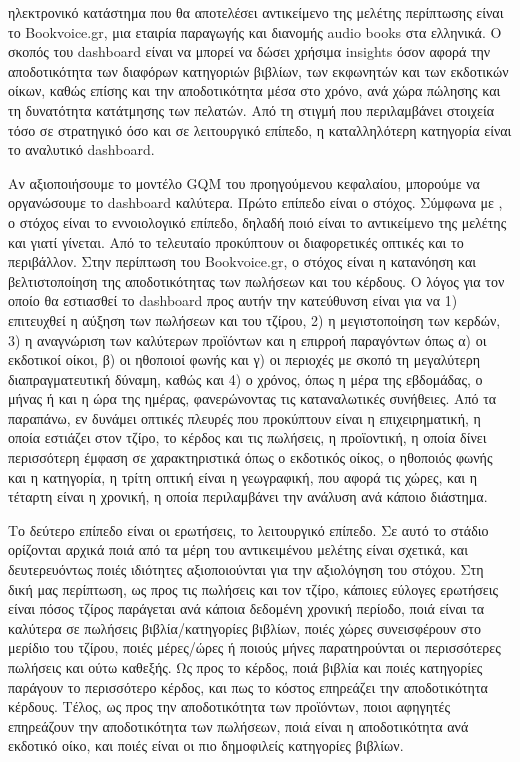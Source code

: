 \documentclass[greek, 12pt]{article}
\begin{document}
 ηλεκτρονικό κατάστημα που θα αποτελέσει αντικείμενο της μελέτης περίπτωσης είναι το Bookvoice.gr, μια εταιρία παραγωγής και διανομής audio books στα ελληνικά. Ο σκοπός του dashboard είναι να μπορεί να δώσει χρήσιμα insights όσον αφορά την αποδοτικότητα των διαφόρων κατηγοριών βιβλίων, των εκφωνητών και των εκδοτικών οίκων, καθώς επίσης και την αποδοτικότητα μέσα στο χρόνο, ανά χώρα πώλησης και τη δυνατότητα κατάτμησης των πελατών. Από τη στιγμή που περιλαμβάνει στοιχεία τόσο σε στρατηγικό όσο και σε λειτουργικό επίπεδο, η καταλληλότερη κατηγορία είναι το αναλυτικό dashboard.

Αν αξιοποιήσουμε το μοντέλο GQM του προηγούμενου κεφαλαίου, μπορούμε να οργανώσουμε το dashboard καλύτερα. Πρώτο επίπεδο είναι ο στόχος. Σύμφωνα με \cite{janes2013effective}, ο στόχος είναι το εννοιολογικό επίπεδο, δηλαδή ποιό είναι το αντικείμενο της μελέτης και γιατί γίνεται. Από το τελευταίο προκύπτουν οι διαφορετικές οπτικές και το περιβάλλον. Στην περίπτωση του Bookvoice.gr, ο στόχος είναι η κατανόηση και βελτιστοποίηση της αποδοτικότητας των πωλήσεων και του κέρδους. Ο λόγος για τον οποίο θα εστιασθεί το dashboard προς αυτήν την κατεύθυνση είναι για να 1) επιτευχθεί η αύξηση των πωλήσεων και του τζίρου, 2) η μεγιστοποίηση των κερδών, 3) η αναγνώριση των καλύτερων προϊόντων και η επιρροή παραγόντων όπως α) οι εκδοτικοί οίκοι, β) οι ηθοποιοί φωνής και γ) οι περιοχές με σκοπό τη μεγαλύτερη διαπραγματευτική δύναμη, καθώς και 4) ο χρόνος, όπως η μέρα της εβδομάδας, ο μήνας ή και η ώρα της ημέρας, φανερώνοντας τις καταναλωτικές συνήθειες. Από τα παραπάνω, εν δυνάμει οπτικές πλευρές που προκύπτουν είναι η επιχειρηματική, η οποία εστιάζει στον τζίρο, το κέρδος και τις πωλήσεις, η προϊοντική, η οποία δίνει περισσότερη έμφαση σε χαρακτηριστικά όπως ο εκδοτικός οίκος, ο ηθοποιός φωνής και η κατηγορία, η τρίτη οπτική είναι η γεωγραφική, που αφορά τις χώρες, και η τέταρτη είναι η χρονική, η οποία περιλαμβάνει την ανάλυση ανά κάποιο διάστημα.

Το δεύτερο επίπεδο είναι οι ερωτήσεις, το λειτουργικό επίπεδο. Σε αυτό το στάδιο ορίζονται αρχικά ποιά από τα μέρη του αντικειμένου μελέτης είναι σχετικά, και δευτερευόντως ποιές ιδιότητες αξιοποιούνται για την αξιολόγηση του στόχου. Στη δική μας περίπτωση, ως προς τις πωλήσεις και τον τζίρο, κάποιες εύλογες ερωτήσεις είναι πόσος τζίρος παράγεται ανά κάποια δεδομένη χρονική περίοδο, ποιά είναι τα καλύτερα σε πωλήσεις βιβλία/κατηγορίες βιβλίων, ποιές χώρες συνεισφέρουν στο μερίδιο του τζίρου, ποιές μέρες/ώρες ή ποιούς μήνες παρατηρούνται οι περισσότερες πωλήσεις και ούτω καθεξής. Ως προς το κέρδος, ποιά βιβλία και ποιές κατηγορίες παράγουν το περισσότερο κέρδος, και πως το κόστος επηρεάζει την αποδοτικότητα κέρδους. Τέλος, ως προς την αποδοτικότητα των προϊόντων, ποιοι αφηγητές επηρεάζουν την αποδοτικότητα των πωλήσεων, ποιά είναι η αποδοτικότητα ανά εκδοτικό οίκο, και ποιές είναι οι πιο δημοφιλείς κατηγορίες βιβλίων.
\end{document}
